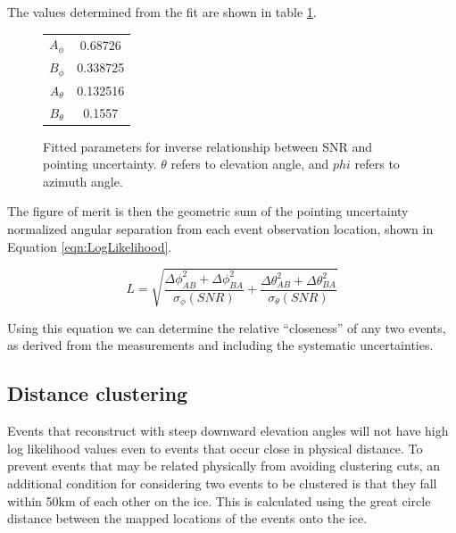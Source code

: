 The values determined from the fit are shown in table \ref{tab:pointVsSNRFit}.

	\begin{figure}
	\centering
	\begin{tabular}[c]{|c|c|}
	\hline
	$A_{\phi}$ & 0.68726 \\
	$B_{\phi}$ & 0.338725 \\
	$A_{\theta}$ & 0.132516 \\
	$B_{\theta}$ & 0.1557 \\
	\hline
	\end{tabular}
	\caption{Fitted parameters for inverse relationship between SNR and pointing uncertainty.  $\theta$ refers to elevation angle, and $phi$ refers to azimuth angle.}
	\label{tab:pointVsSNRFit}
	\end{figure}
	
							
		The figure of merit is then the geometric sum of the pointing uncertainty normalized angular separation from each event observation location, shown in Equation \ref{eqn:LogLikelihood}.
		
	\begin{equation}
		L = \sqrt{\frac{\Delta\phi_{AB}^2   + \Delta\phi_{BA}^2}{\sigma_{\phi}(SNR)} + \frac{\Delta\theta_{AB}^2 + \Delta\theta_{BA}^2}{\sigma_{\theta}(SNR)}}
		\label{eqn:LogLikelihood}
	\end{equation}


		Using this equation we can determine the relative ``closeness'' of any two events, as derived from the measurements and including the systematic uncertainties.
		
	
	\subsection{Distance clustering}
		Events that reconstruct with steep downward elevation angles will not have high log likelihood values even to events that occur close in physical distance.  To prevent events that may be related physically from avoiding clustering cuts, an additional condition for considering two events to be clustered is that they fall within 50km of each other on the ice.  This is calculated using the great circle distance between the mapped locations of the events onto the ice.
	
